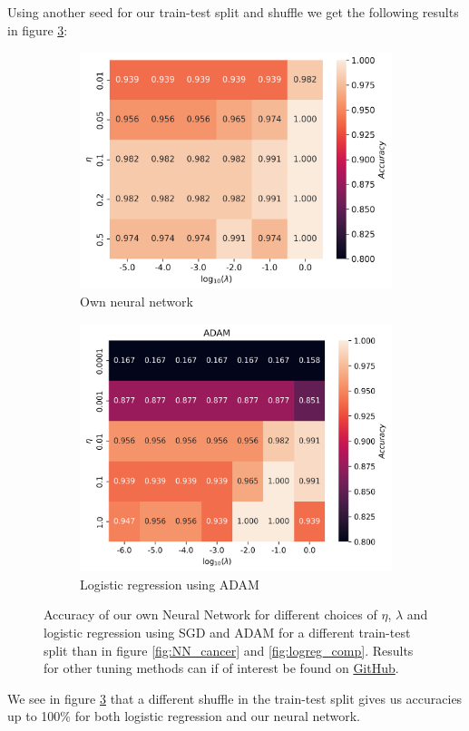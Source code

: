 \documentclass[11pt]{article}
\begin{document}
Using another seed for our train-test split and shuffle we get the following results in figure \ref{fig:cancer_best}:
\begin{figure}[H]
    \begin{subfigure}{.5\textwidth}
        \centering
        \includegraphics[width=\textwidth]{../figures/cancer_eta_lmb_best.png}
        \caption{Own neural network}
        \label{fig:}
    \end{subfigure}
    \begin{subfigure}{.5\textwidth}
        \centering
        \includegraphics[width=\textwidth]{../figures/logreg_ADAM_best.png}
        \caption{Logistic regression using ADAM}
        \label{fig:}
    \end{subfigure}
    \caption{Accuracy of our own Neural Network for different choices of $\eta$, $\lambda$ and logistic regression using SGD and ADAM for a different train-test split than in figure \ref{fig:NN_cancer} and \ref{fig:logreg_comp}. Results for other tuning methods can if of interest be found on \href{https://github.com/Fslippe/FYS-STK4155/tree/main/project2}{GitHub}.}
    \label{fig:cancer_best}
\end{figure}
We see in figure \ref{fig:cancer_best} that a different shuffle in the train-test split gives us accuracies up to 100\% for both logistic regression and our neural network.
\end{document}
